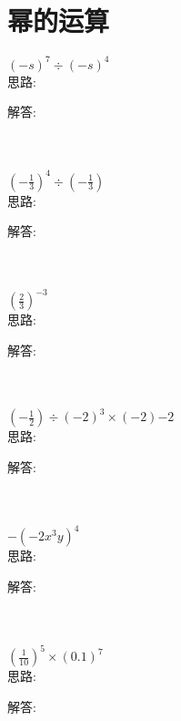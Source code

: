 \section{幂的运算}

\item {
    $ (-s)^7\div (-s)^4 $ 
    \ifshowSolution
        \fangsong{}
        \\
        思路:

        解答: 
    \else
        \\ \\ \\
    \fi
}

\item {
    $ (-\frac13)^4\div (-\frac13) $ 
    \ifshowSolution
        \fangsong{}
        \\
        思路:

        解答: 
    \else
        \\ \\ \\
    \fi
}

\item {
    $ (\frac23)^{-3} $ 
    \ifshowSolution
        \fangsong{}
        \\
        思路:

        解答: 
    \else
        \\ \\ \\
    \fi
}

\item {
    $ (-\frac12)\div (-2)^{3} \times (-2){-2} $ 
    \ifshowSolution
        \fangsong{}
        \\
        思路:

        解答: 
    \else
        \\ \\ \\
    \fi
}

\item {
    $ -(-2x^3y)^4 $ 
    \ifshowSolution
        \fangsong{}
        \\
        思路:

        解答: 
    \else
        \\ \\ \\
    \fi
}


\item {
    $ (\frac{1}{10})^5 \times (0.1)^7$
    \ifshowSolution
        \fangsong{}
        \\
        思路:

        解答: 
    \else
        \\ \\ \\
    \fi
}

